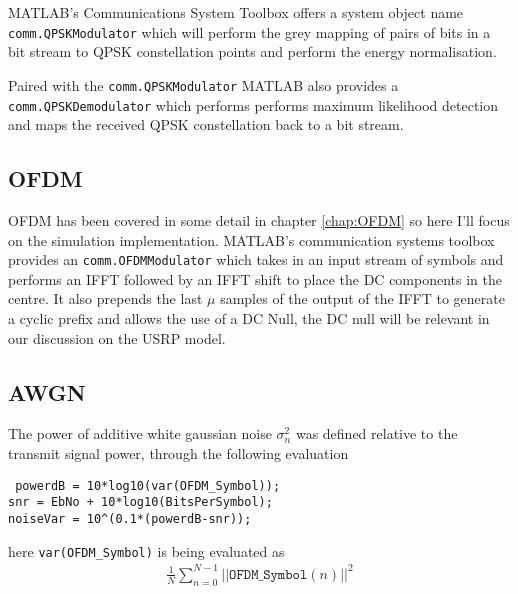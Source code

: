 MATLAB's Communications System Toolbox offers %
a system object name \texttt{comm.QPSKModulator} %
\cite{QPSKModulator} which %
will perform the grey mapping of pairs of bits in a %
bit stream to QPSK constellation points and perform %
the energy normalisation.

Paired with the \texttt{comm.QPSKModulator} MATLAB also %
provides a \texttt{comm.QPSKDemodulator} \cite{QPSKDemodulator} %
which performs %
performs maximum likelihood detection and maps %
the received QPSK constellation back to a bit %
stream.

\subsection{OFDM}

OFDM has been covered in some detail in chapter %
\ref{chap:OFDM} so here I'll focus on the simulation %
implementation. MATLAB's communication systems %
toolbox provides an \texttt{comm.OFDMModulator} %
\cite{OFDMModulator} which %
takes in an input stream of symbols and performs %
an IFFT followed by an IFFT shift to place the DC %
components in the centre. It also prepends the %
last $\mu$ samples of the output of the IFFT to %
generate a cyclic prefix and allows the use %
of a DC Null, the DC null will be relevant in %
our discussion on the USRP model.

\subsection{AWGN}

The power of additive white gaussian noise $\sigma_n^{2}$ %
was defined relative to the transmit signal power, through %
the following evaluation

\texttt{%
powerdB = 10*log10(var(OFDM\_Symbol));\\%
snr = EbNo + 10*log10(BitsPerSymbol);\\%
noiseVar = 10\textasciicircum(0.1*(powerdB-snr));}

here \texttt{var(OFDM\_Symbol)} is being evaluated %
as 
\begin{align}
	\frac{1}{N} %
	\sum_{n=0}^{N-1} \lvert\lvert \texttt{OFDM\_Symbol}%
	(n) \rvert\rvert^{2}
\end{align}

